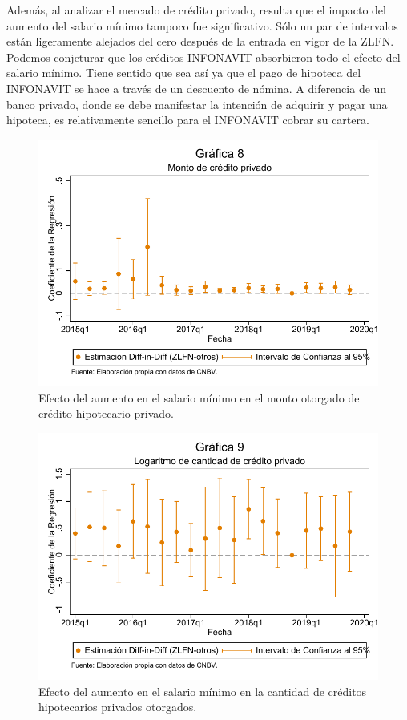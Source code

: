Además, al analizar el mercado de crédito privado, resulta que el impacto del aumento del salario mínimo tampoco fue significativo. Sólo un par de intervalos están ligeramente alejados del cero después de la entrada en vigor de la ZLFN. Podemos conjeturar que los créditos INFONAVIT absorbieron todo el efecto del salario mínimo. Tiene sentido que sea así ya que el pago de hipoteca del INFONAVIT se hace a través de un descuento de nómina. A diferencia de un banco privado, donde se debe manifestar la intención de adquirir y pagar una hipoteca, es relativamente sencillo para el INFONAVIT cobrar su cartera.

\begin{figure}[H]
\includegraphics[width=\textwidth]{Figures/Creditos_Muestracompleta.pdf}
\caption{Efecto del aumento en el salario mínimo en el monto otorgado de crédito hipotecario privado.}
\label{fig:8}
\end{figure}

\begin{figure}[H]
\includegraphics[width=\textwidth]{Figures/Cantidad_Muestracompleta.pdf}
\caption{Efecto del aumento en el salario mínimo en la cantidad de créditos hipotecarios privados otorgados.}
\label{fig:9}
\end{figure}

